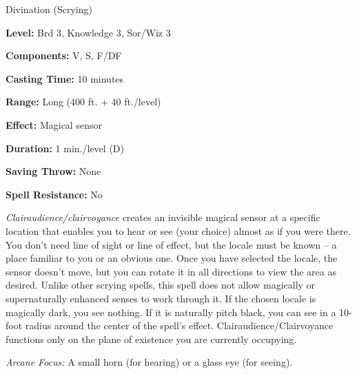 \label{spell:Clairaudience}\label{spell:Clairvoyance}

Divination (Scrying)

\textbf{Level:} Brd 3, Knowledge 3, Sor/Wiz 3

\textbf{Components:} V, S, F/DF

\textbf{Casting Time:} 10 minutes

\textbf{Range:} Long (400 ft. + 40 ft./level)

\textbf{Effect:} Magical sensor

\textbf{Duration:} 1 min./level (D)

\textbf{Saving Throw:} None

\textbf{Spell Resistance:} No

\textit{Clairaudience/clairvoyance} creates an invisible magical sensor at a specific 
location that enables you to hear or see (your choice) almost as if you were there. 
You don't need line of sight or line of effect, but the locale must be known -- a 
place familiar to you or an obvious one. Once you have selected the locale, the 
sensor doesn't move, but you can rotate it in all directions to view the area as 
desired. Unlike other scrying spells, this spell does not allow magically or supernaturally 
enhanced senses to work through it. If the chosen locale is magically dark, you 
see nothing. If it is naturally pitch black, you can see in a 10- foot radius around 
the center of the spell's effect. Clairaudience/Clairvoyance functions 
only on the plane of existence you are currently occupying.

\textit{Arcane Focus:} A small horn (for hearing) or a glass eye (for seeing).

